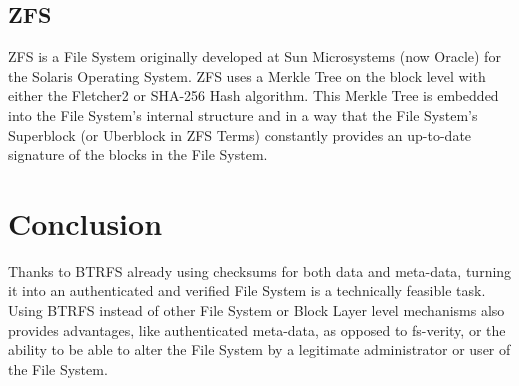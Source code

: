 \documentclass[10pt]{article}
\begin{document}
\subsection{ZFS}
ZFS\cite{ZFS} is a File System originally developed at Sun Microsystems (now
Oracle) for the Solaris Operating System. ZFS uses a Merkle Tree\cite{ZFS} on
the block level with either the Fletcher2 or SHA-256 Hash algorithm. This
Merkle Tree is embedded into the File System's internal structure and in a
way that the File System's Superblock (or Uberblock in ZFS Terms) constantly
provides an up-to-date signature of the blocks in the File System.

\section{Conclusion}
Thanks to BTRFS already using checksums for both data and meta-data, turning
it into an authenticated and verified File System is a technically feasible
task.  Using BTRFS instead of other File System or Block Layer level
mechanisms also provides advantages, like authenticated meta-data, as opposed
to fs-verity, or the ability to be able to alter the File System by a
legitimate administrator or user of the File System.
\end{document}
